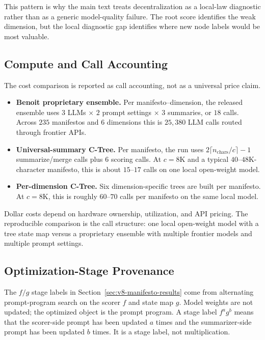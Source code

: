 This pattern is why the main text treats decentralization as a local-law
diagnostic rather than as a generic model-quality failure. The root score
identifies the weak dimension, but the local diagnostic gap identifies where
new node labels would be most valuable.

\subsection{Compute and Call Accounting}

The cost comparison is reported as call accounting, not as a universal price
claim.

\begin{itemize}[leftmargin=1.5em]
    \item \textbf{Benoit proprietary ensemble.} Per
          manifesto--dimension, the released ensemble uses
          \(3\) LLMs \(\times\) \(2\) prompt settings \(\times\)
          \(3\) summaries, or \(18\) calls. Across \(235\) manifestos and
          \(6\) dimensions this is \(25{,}380\) LLM calls routed through
          frontier APIs.
    \item \textbf{Universal-summary C-Tree.} Per manifesto, the run uses
          \(2\lceil n_{\mathrm{chars}}/c\rceil-1\) summarize/merge calls plus
          \(6\) scoring calls. At \(c=8\mathrm{K}\) and a typical
          \(40\)--\(48\)K-character manifesto, this is about \(15\)--\(17\)
          calls on one local open-weight model.
    \item \textbf{Per-dimension C-Tree.} Six dimension-specific trees are
          built per manifesto. At \(c=8\mathrm{K}\), this is roughly
          \(60\)--\(70\) calls per manifesto on the same local model.
\end{itemize}

Dollar costs depend on hardware ownership, utilization, and API pricing. The
reproducible comparison is the call structure: one local open-weight model
with a tree state map versus a proprietary ensemble with multiple frontier
models and multiple prompt settings.

\subsection{Optimization-Stage Provenance}
\label{app:v8-rile-fg-ladder}

The \(f/g\) stage labels in Section~\ref{sec:v8-manifesto-results} come from
alternating prompt-program search on the scorer \(f\) and state map \(g\).
Model weights are not updated; the optimized object is the prompt program. A
stage label \(f^a g^b\) means that the scorer-side prompt has been updated
\(a\) times and the summarizer-side prompt has been updated \(b\) times. It is
a stage label, not multiplication.

